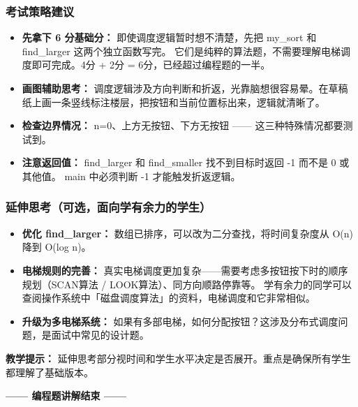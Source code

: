\subsubsection{考试策略建议}

\begin{itemize}
    \item \textbf{先拿下 6 分基础分：} 即使调度逻辑暂时想不清楚，先把 my\_sort 和 find\_larger 这两个独立函数写完。
    它们是纯粹的算法题，不需要理解电梯调度即可完成。4分 + 2分 = 6分，已经超过编程题的一半。
    \item \textbf{画图辅助思考：} 调度逻辑涉及方向判断和折返，光靠脑想很容易晕。在草稿纸上画一条竖线标注楼层，把按钮和当前位置标出来，逻辑就清晰了。
    \item \textbf{检查边界情况：} n=0、上方无按钮、下方无按钮 —— 这三种特殊情况都要测试到。
    \item \textbf{注意返回值：} find\_larger 和 find\_smaller 找不到目标时返回 -1 而不是 0 或其他值。
    main 中必须判断 -1 才能触发折返逻辑。
\end{itemize}

\subsubsection{延伸思考（可选，面向学有余力的学生）}

\begin{itemize}
    \item \textbf{优化 find\_larger：} 数组已排序，可以改为二分查找，将时间复杂度从 O(n) 降到 O(log n)。
    \item \textbf{电梯规则的完善：} 真实电梯调度更加复杂——需要考虑多按钮按下时的顺序规划（SCAN算法 / LOOK算法）、同方向顺路停靠等。
    学有余力的同学可以查阅操作系统中「磁盘调度算法」的资料，电梯调度和它非常相似。
    \item \textbf{升级为多电梯系统：} 如果有多部电梯，如何分配按钮？这涉及分布式调度问题，是面试中常见的设计题。
\end{itemize}

\textbf{教学提示：} 延伸思考部分视时间和学生水平决定是否展开。重点是确保所有学生都理解了基础版本。

\bigskip

\begin{center}
    \textbf{—— 编程题讲解结束 ——}
\end{center}
